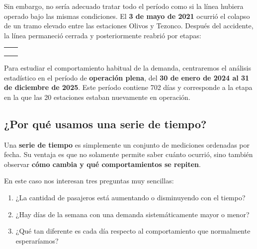 \documentclass[
  12pt,
  titlepage]{article}
\providecommand{\tightlist}{%
  \setlength{\itemsep}{0pt}\setlength{\parskip}{0pt}}
\begin{document}
Sin embargo, no sería adecuado tratar todo el período como si la línea hubiera operado bajo las mismas condiciones. El \textbf{3 de mayo de 2021} ocurrió el colapso de un tramo elevado entre las estaciones Olivos y Tezonco. Después del accidente, la línea permaneció cerrada y posteriormente reabrió por etapas:

\begingroup\fontsize{10}{12}\selectfont

\begin{longtable}[t]{|>{}c|>{}c|}
\hline
\cellcolor{UNAMBlue}{\textcolor{white}{\textbf{Fecha}}} & \cellcolor{UNAMBlue}{\textcolor{white}{\textbf{Estaciones.en.servicio}}}\\
\hline
\cellcolor{UNAMLightBlue}{15 ene 2023} & \cellcolor{UNAMLightBlue}{9 de 20}\\
\hline
\cellcolor{UNAMLightBlue}{16 jul 2023} & \cellcolor{UNAMLightBlue}{14 de 20}\\
\hline
\cellcolor{UNAMLightBlue}{23--29 ene 2024} & \cellcolor{UNAMLightBlue}{20 de 20}\\
\hline
\end{longtable}
\endgroup{}

Para estudiar el comportamiento habitual de la demanda, centraremos el análisis estadístico en el período de \textbf{operación plena}, del \textbf{30 de enero de 2024 al 31 de diciembre de 2025}. Este período contiene 702 días y corresponde a la etapa en la que las 20 estaciones estaban nuevamente en operación.

\subsection{¿Por qué usamos una serie de tiempo?}\label{por-quuxe9-usamos-una-serie-de-tiempo}

Una \textbf{serie de tiempo} es simplemente un conjunto de mediciones ordenadas por fecha. Su ventaja es que no solamente permite saber cuánto ocurrió, sino también observar \textbf{cómo cambia y qué comportamientos se repiten}.

En este caso nos interesan tres preguntas muy sencillas:

\begin{enumerate}
\def\labelenumi{\arabic{enumi}.}
\tightlist
\item
  ¿La cantidad de pasajeros está aumentando o disminuyendo con el tiempo?
\item
  ¿Hay días de la semana con una demanda sistemáticamente mayor o menor?
\item
  ¿Qué tan diferente es cada día respecto al comportamiento que normalmente esperaríamos?
\end{enumerate}
\end{document}
